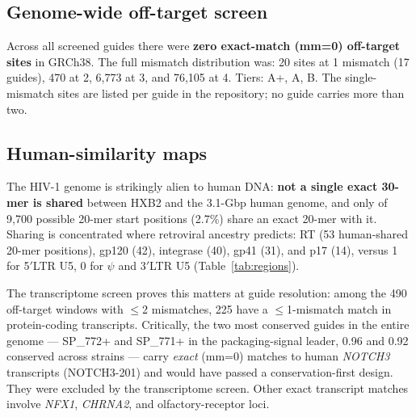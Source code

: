 \documentclass[11pt]{article}
\newcommand{\src}[1]{[#1]}
\newcommand{\HH}{HIV-1}
\begin{document}
\begin{table}[ht]\centering\small
\caption{HXB2 regions (GenBank\src{48} / LANL map\src{51} coordinates),
median guide conservation across 25 strains, LANL per-region mean Shannon
entropy\src{51} where published, number of tier-A+ guides, and exact
20-mer sharing with the human genome (hu) and protein-coding transcriptome
(tx). $^{\dagger}$literature-derived, unverified.}
\label{tab:regions}

\end{table}

\subsection{Genome-wide off-target screen}
Across all \nguides{} screened guides there were \textbf{zero exact-match
(mm=0) off-target sites} in GRCh38. The full mismatch distribution was:
20 sites at 1 mismatch (17 guides), 470 at 2, 6,773 at 3, and 76,105 at 4.
Tiers: \naplus{} A+, \na{} A, \nb{} B. The single-mismatch sites are listed
per guide in the repository; no guide carries more than two.

\subsection{Human-similarity maps}
\label{sec:similarity}
The \HH{} genome is strikingly alien to human DNA: \textbf{not a single
exact 30-mer is shared} between HXB2 and the 3.1-Gbp human genome, and only
\ktwenty{} of 9,700 possible 20-mer start positions (2.7\%) share an exact
20-mer with it. Sharing is concentrated where retroviral ancestry predicts:
RT (53 human-shared 20-mer positions), gp120 (42), integrase (40), gp41
(31), and p17 (14), versus 1 for 5$'$LTR U5, 0 for $\psi$ and 3$'$LTR U5
(Table~\ref{tab:regions}).

The transcriptome screen proves this matters at guide resolution: among the
490 off-target windows with $\le$2 mismatches, 225 have a $\le$1-mismatch
match in protein-coding transcripts. Critically, the two most conserved
guides in the entire genome --- SP\_772+ and SP\_771+ in the
packaging-signal leader, 0.96 and 0.92 conserved across strains --- carry
\emph{exact} (mm=0) matches to human \emph{NOTCH3} transcripts
(NOTCH3-201) and would have passed a conservation-first design. They were
excluded by the transcriptome screen. Other exact transcript matches
involve \emph{NFX1}, \emph{CHRNA2}, and olfactory-receptor loci.
\end{document}
